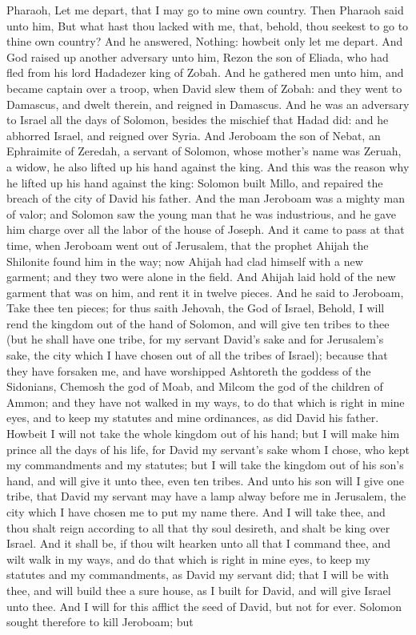 Pharaoh, Let me depart, that I may go to mine own country. Then Pharaoh said unto him, But what hast thou lacked with me, that, behold, thou seekest to go to thine own country? And he answered, Nothing: howbeit only let me depart.  And God raised up another adversary unto him, Rezon the son of Eliada, who had fled from his lord Hadadezer king of Zobah. And he gathered men unto him, and became captain over a troop, when David slew them of Zobah: and they went to Damascus, and dwelt therein, and reigned in Damascus. And he was an adversary to Israel all the days of Solomon, besides the mischief that Hadad did: and he abhorred Israel, and reigned over Syria.  And Jeroboam the son of Nebat, an Ephraimite of Zeredah, a servant of Solomon, whose mother’s name was Zeruah, a widow, he also lifted up his hand against the king. And this was the reason why he lifted up his hand against the king: Solomon built Millo, and repaired the breach of the city of David his father. And the man Jeroboam was a mighty man of valor; and Solomon saw the young man that he was industrious, and he gave him charge over all the labor of the house of Joseph. And it came to pass at that time, when Jeroboam went out of Jerusalem, that the prophet Ahijah the Shilonite found him in the way; now Ahijah had clad himself with a new garment; and they two were alone in the field. And Ahijah laid hold of the new garment that was on him, and rent it in twelve pieces. And he said to Jeroboam, Take thee ten pieces; for thus saith Jehovah, the God of Israel, Behold, I will rend the kingdom out of the hand of Solomon, and will give ten tribes to thee (but he shall have one tribe, for my servant David’s sake and for Jerusalem’s sake, the city which I have chosen out of all the tribes of Israel); because that they have forsaken me, and have worshipped Ashtoreth the goddess of the Sidonians, Chemosh the god of Moab, and Milcom the god of the children of Ammon; and they have not walked in my ways, to do that which is right in mine eyes, and to keep my statutes and mine ordinances, as did David his father. Howbeit I will not take the whole kingdom out of his hand; but I will make him prince all the days of his life, for David my servant’s sake whom I chose, who kept my commandments and my statutes; but I will take the kingdom out of his son’s hand, and will give it unto thee, even ten tribes. And unto his son will I give one tribe, that David my servant may have a lamp alway before me in Jerusalem, the city which I have chosen me to put my name there. And I will take thee, and thou shalt reign according to all that thy soul desireth, and shalt be king over Israel. And it shall be, if thou wilt hearken unto all that I command thee, and wilt walk in my ways, and do that which is right in mine eyes, to keep my statutes and my commandments, as David my servant did; that I will be with thee, and will build thee a sure house, as I built for David, and will give Israel unto thee. And I will for this afflict the seed of David, but not for ever. Solomon sought therefore to kill Jeroboam; but 